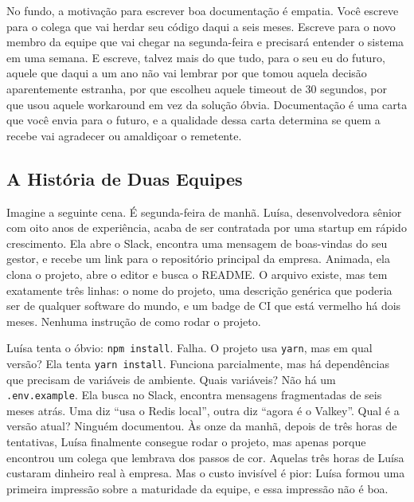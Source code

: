 No fundo, a motivação para escrever boa documentação é empatia. Você
escreve para o colega que vai herdar seu código daqui a seis meses.
Escreve para o novo membro da equipe que vai chegar na segunda-feira
e precisará entender o sistema em uma semana. E escreve, talvez mais
do que tudo, para o seu eu do futuro, aquele que daqui a um ano
não vai lembrar por que tomou aquela decisão aparentemente estranha,
por que escolheu aquele timeout de 30 segundos, por que usou aquele
workaround em vez da solução óbvia. Documentação é uma carta que você
envia para o futuro, e a qualidade dessa carta determina se quem a
recebe vai agradecer ou amaldiçoar o remetente.

\subsection{A História de Duas Equipes}

Imagine a seguinte cena. É segunda-feira de manhã. Luísa, desenvolvedora
sênior com oito anos de experiência, acaba de ser contratada por uma startup
em rápido crescimento. Ela abre o Slack, encontra uma mensagem de boas-vindas
do seu gestor, e recebe um link para o repositório principal da empresa.
Animada, ela clona o projeto, abre o editor e busca o README. O arquivo
existe, mas tem exatamente três linhas: o nome do projeto, uma descrição
genérica que poderia ser de qualquer software do mundo, e um badge de CI
que está vermelho há dois meses. Nenhuma instrução de como rodar o projeto.

Luísa tenta o óbvio: \texttt{npm install}. Falha. O projeto usa \texttt{yarn},
mas em qual versão? Ela tenta \texttt{yarn install}. Funciona parcialmente,
mas há dependências que precisam de variáveis de ambiente. Quais variáveis?
Não há um \texttt{.env.example}. Ela busca no Slack, encontra mensagens
fragmentadas de seis meses atrás. Uma diz ``usa o Redis local'', outra diz
``agora é o Valkey''. Qual é a versão atual? Ninguém documentou. Às onze
da manhã, depois de três horas de tentativas, Luísa finalmente consegue
rodar o projeto, mas apenas porque encontrou um colega que lembrava dos
passos de cor. Aquelas três horas de Luísa custaram dinheiro real à empresa.
Mas o custo invisível é pior: Luísa formou uma primeira impressão sobre a
maturidade da equipe, e essa impressão não é boa.

